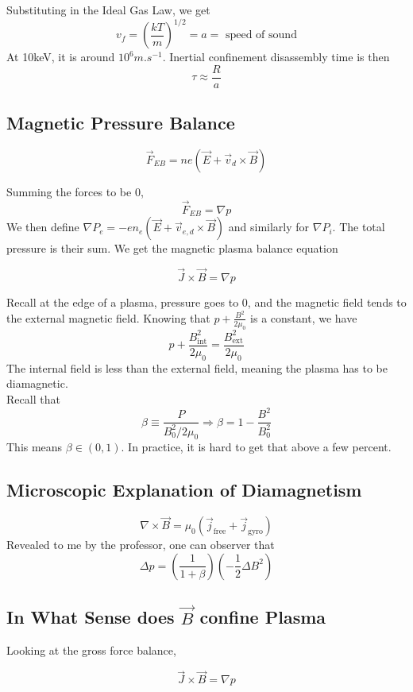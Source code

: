 \documentclass[12pt]{article}
\begin{document}
Substituting in the Ideal Gas Law, we get
$$v_f = \left(\frac{kT}{m}\right)^{1/2} = a = \text{ speed of sound}$$
At 10keV, it is around $10^6\unit{m.s^{-1}}$. Inertial confinement disassembly time is then
$$\tau \approx \frac{R}{a}$$

\subsection{Magnetic Pressure Balance}

$$\vec F_{EB} = ne(\vec E + \vec v_d \times \vec B)$$

Summing the forces to be 0,
$$\vec F_{EB} = \nabla p$$
We then define $\nabla P_e = -en_e(\vec E + \vec v_{e,d} \times \vec B)$ and similarly for $\nabla P_i$. The total pressure is their sum. We get the magnetic plasma balance equation

\begin{equation}
    \vec J \times \vec B = \nabla p
\end{equation}

Recall at the edge of a plasma, pressure goes to 0, and the magnetic field tends to the external magnetic field. Knowing that $p + \frac{B^2}{2\mu_0}$ is a constant, we have
$$p + \frac{B_{\text{int}}^2}{2\mu_0} = \frac{B_{\text{ext}}^2}{2\mu_0}$$
The internal field is less than the external field, meaning the plasma has to be diamagnetic. \\
Recall that
$$\beta \equiv \frac{P}{B_0^2/2\mu_0} \Rightarrow \beta = 1 - \frac{B^2}{B_0^2}$$
This means $\beta \in (0,1)$. In practice, it is hard to get that above a few percent.

\subsection{Microscopic Explanation of Diamagnetism}

$$\nabla \times \vec B = \mu_0\left(\vec j_{\text{free}} + \vec j_{\text{gyro}}\right)$$
Revealed to me by the professor, one can observer that
$$\Delta p = \left(\frac{1}{1+\beta}\right)\left(-\frac{1}{2}\Delta B^2\right)$$

\subsection{In What Sense does $\vec B$ confine Plasma}

Looking at the gross force balance,

$$\vec J \times \vec B = \nabla p$$
\end{document}
